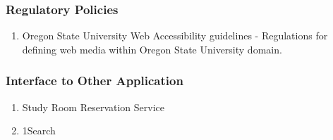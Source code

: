 \documentclass[letterpaper,10pt,titlepage, onecolumn, compsoc]{IEEEtran}
\begin{document}
\subsubsection{Regulatory Policies}
\begin{enumerate}
	\item Oregon State University Web Accessibility guidelines - Regulations for defining web media within Oregon State University domain.
\end{enumerate}


\subsubsection{Interface to Other Application}
\begin{enumerate}
	\item Study Room Reservation Service
    \item 1Search
\end{enumerate}





\end{document}
